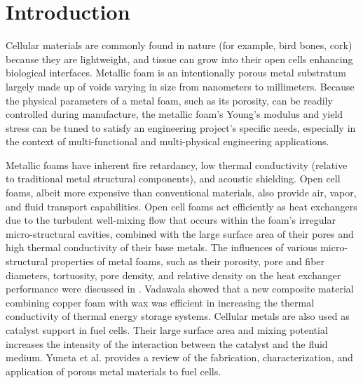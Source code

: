 \documentclass[review]{elsarticle}
\begin{document}
\linenumbers

\section{Introduction}

Cellular materials are commonly found in nature (for example, bird bones, cork) because they are lightweight, and tissue can grow into their open cells enhancing biological interfaces. Metallic foam is an intentionally porous metal substratum largely made up of voids varying in size from nanometers to millimeters. Because the physical parameters of a metal foam, such as its porosity, can be readily controlled during manufacture, the metallic foam's Young's modulus and yield stress can be tuned to satisfy an engineering project's specific needs, especially in the context of multi-functional and multi-physical engineering applications.

Metallic foams have inherent fire retardancy, low thermal conductivity (relative to traditional metal structural components), and acoustic shielding. Open cell foams, albeit more expensive than conventional materials, also provide air, vapor, and fluid transport capabilities. Open cell foams act efficiently as heat exchangers due to the turbulent well-mixing flow that occurs within the foam's irregular micro-structural cavities, combined with the large surface area of their pores and high thermal conductivity of their base metals. The influences of various micro-structural properties of metal foams, such as their porosity, pore and fiber diameters, tortuosity, pore density, and relative density on the heat exchanger performance were discussed in \cite{MahjoobKambiz2008}. Vadawala \cite{Vadwala2011} showed that a new composite material combining copper foam with wax was efficient in increasing the thermal conductivity of thermal energy storage systems. Cellular metals are also used as catalyst support in fuel cells. Their large surface area and mixing potential increases the intensity of the interaction between the catalyst and the fluid medium. Yuneta et al. \cite{Yuanetal2012} provides a review of the fabrication, characterization, and application of porous metal materials to fuel cells.
\end{document}
